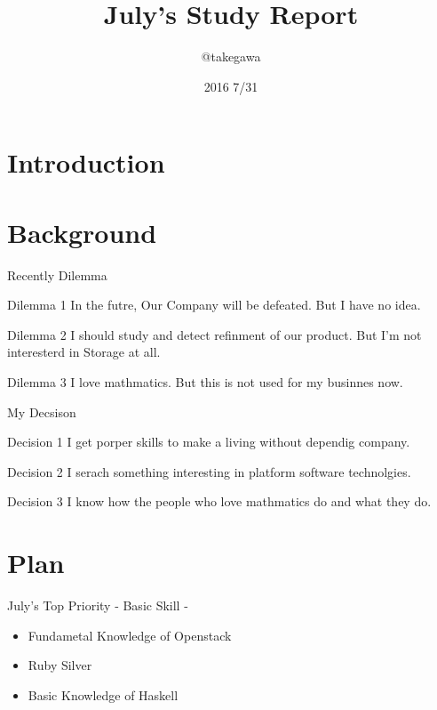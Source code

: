 \documentclass[12pt, unicode]{beamer}
\title{July's Study Report}
\author{@takegawa}
\date[today]{ 2016 7/31}
\institute{Tokyo Univerisity etc}
\begin{document}
\frame{\maketitle}

\section{Introduction}

\begin{frame}{}
 \tableofcontents
\end{frame}

\section{Background}
\label{sec:background}
\begin{frame}{Recently Dilemma}
  \begin{block}{Dilemma 1}
  In the futre, Our Company will be defeated. But I have no idea.
  \end{block}
  \begin{block}{Dilemma 2}
    I should study and detect refinment of our product. But I'm not interesterd in Storage at all.
  \end{block}
  \begin{block}{Dilemma 3}
    I love mathmatics. But this is not used for my businnes now.
  \end{block}
\end{frame}

\begin{frame}{My Decsison}
  \begin{block}{Decision 1}
    I  get porper skills  to make a living without dependig company.
  \end{block}

  \begin{block}{Decision 2}
    I serach something interesting in platform software technolgies.
  \end{block}

  \begin{block}{Decision 3}
    I know how the people who love mathmatics do and what they do.
  \end{block}

\end{frame}

\section{Plan}
\begin{frame}{July's Top Priority - Basic Skill -}
  \begin{itemize}
    \item Fundametal Knowledge of Openstack
    \item Ruby Silver
    \item Basic Knowledge of Haskell
  \end{itemize}
\end{frame}
\end{document}
